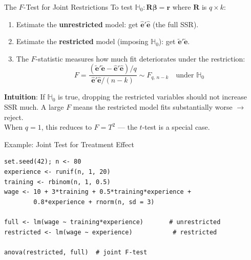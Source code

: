 \documentclass[aspectratio=169, handout, t]{beamer}
\numberwithin{equation}{section}
\begin{document}
\begin{frame}{The $F$-Test for Joint Restrictions}
To test $\mathbb{H}_0: \bm{R\beta}=\bm{r}$ where $\bm{R}$ is $q\times k$:\pause
\begin{enumerate}\setlength{\itemsep}{6pt}
\item Estimate the \textbf{unrestricted} model: get $\hat{\bm{e}}'\hat{\bm{e}}$ (the full SSR).\pause
\item Estimate the \textbf{restricted} model (imposing $\mathbb{H}_0$): get $\tilde{\bm{e}}'\tilde{\bm{e}}$.\pause
\item The $F$-statistic measures how much fit deteriorates under the restriction:
$$F = \frac{(\tilde{\bm{e}}'\tilde{\bm{e}} - \hat{\bm{e}}'\hat{\bm{e}})/q}{\hat{\bm{e}}'\hat{\bm{e}}/(n - k)} \sim F_{q,\, n-k} \quad\text{under }\mathbb{H}_0$$
\end{enumerate}\pause
\medskip
\textbf{Intuition}: If $\mathbb{H}_0$ is true, dropping the restricted variables should not increase SSR much.  A large $F$ means the restricted model fits \alert{substantially worse} $\to$ reject.\pause\\[4pt]
When $q=1$, this reduces to $F=T^2$ --- the $t$-test is a special case.
\end{frame}

\begin{frame}[fragile]{Example: Joint Test for Treatment Effect}
\begin{lstlisting}[style=Rstyle]
set.seed(42); n <- 80
experience <- runif(n, 1, 20)
training <- rbinom(n, 1, 0.5)
wage <- 10 + 3*training + 0.5*training*experience +
        0.8*experience + rnorm(n, sd = 3)

full <- lm(wage ~ training*experience)       # unrestricted
restricted <- lm(wage ~ experience)           # restricted

anova(restricted, full)  # joint F-test
\end{lstlisting}
\end{frame}
\end{document}
